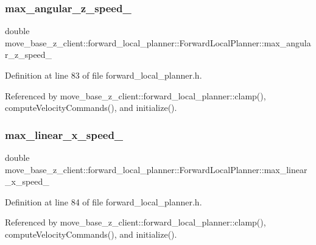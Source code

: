 \subsubsection{\texorpdfstring{max\+\_\+angular\+\_\+z\+\_\+speed\+\_\+}{max\_angular\_z\_speed\_}}
{\footnotesize\ttfamily double move\+\_\+base\+\_\+z\+\_\+client\+::forward\+\_\+local\+\_\+planner\+::\+Forward\+Local\+Planner\+::max\+\_\+angular\+\_\+z\+\_\+speed\+\_\+\hspace{0.3cm}{\ttfamily [private]}}



Definition at line 83 of file forward\+\_\+local\+\_\+planner.\+h.



Referenced by move\+\_\+base\+\_\+z\+\_\+client\+::forward\+\_\+local\+\_\+planner\+::clamp(), compute\+Velocity\+Commands(), and initialize().

\mbox{\label{classmove__base__z__client_1_1forward__local__planner_1_1ForwardLocalPlanner_ad08d97c8679f1da4455de4e03e1861ae}} 
\subsubsection{\texorpdfstring{max\+\_\+linear\+\_\+x\+\_\+speed\+\_\+}{max\_linear\_x\_speed\_}}
{\footnotesize\ttfamily double move\+\_\+base\+\_\+z\+\_\+client\+::forward\+\_\+local\+\_\+planner\+::\+Forward\+Local\+Planner\+::max\+\_\+linear\+\_\+x\+\_\+speed\+\_\+\hspace{0.3cm}{\ttfamily [private]}}



Definition at line 84 of file forward\+\_\+local\+\_\+planner.\+h.



Referenced by move\+\_\+base\+\_\+z\+\_\+client\+::forward\+\_\+local\+\_\+planner\+::clamp(), compute\+Velocity\+Commands(), and initialize().

